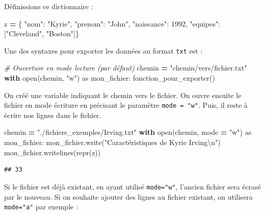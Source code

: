 \documentclass[
  12pt,
]{book}
\newenvironment{Shaded}{\begin{snugshade}}{\end{snugshade}}
\newcommand{\BuiltInTok}[1]{#1}
\newcommand{\CharTok}[1]{\textcolor[rgb]{0.31,0.60,0.02}{#1}}
\newcommand{\CommentTok}[1]{\textcolor[rgb]{0.56,0.35,0.01}{\textit{#1}}}
\newcommand{\ControlFlowTok}[1]{\textcolor[rgb]{0.13,0.29,0.53}{\textbf{#1}}}
\newcommand{\DecValTok}[1]{\textcolor[rgb]{0.00,0.00,0.81}{#1}}
\newcommand{\ImportTok}[1]{#1}
\newcommand{\NormalTok}[1]{#1}
\newcommand{\OperatorTok}[1]{\textcolor[rgb]{0.81,0.36,0.00}{\textbf{#1}}}
\newcommand{\StringTok}[1]{\textcolor[rgb]{0.31,0.60,0.02}{#1}}
\numberwithin{equation}{section}
\numberwithin{countremarque}{section}
\begin{document}
Définissions ce dictionnaire :

\begin{Shaded}
\begin{Highlighting}[]
\NormalTok{z }\OperatorTok{=}\NormalTok{ \{ }\StringTok{"nom"}\NormalTok{: }\StringTok{"Kyrie"}\NormalTok{,}
  \StringTok{"prenom"}\NormalTok{: }\StringTok{"John"}\NormalTok{,}
  \StringTok{"naissance"}\NormalTok{: }\DecValTok{1992}\NormalTok{,}
  \StringTok{"equipes"}\NormalTok{: [}\StringTok{"Cleveland"}\NormalTok{, }\StringTok{"Boston"}\NormalTok{]\}}
\end{Highlighting}
\end{Shaded}

Une des syntaxes pour exporter les données au format \texttt{txt} est :

\begin{Shaded}
\begin{Highlighting}[]
\CommentTok{\# Ouverture en mode lecture (par défaut)}
\NormalTok{chemin }\OperatorTok{=} \StringTok{"chemin/vers/fichier.txt"}
\ControlFlowTok{with} \BuiltInTok{open}\NormalTok{(chemin, }\StringTok{"w"}\NormalTok{) }\ImportTok{as}\NormalTok{ mon\_fichier:}
\NormalTok{  fonction\_pour\_exporter()}
\end{Highlighting}
\end{Shaded}

On créé une variable indiquant le chemin vers le fichier. On ouvre ensuite le fichier en mode écriture en précisant le paramètre \texttt{mode\ =\ "w"}. Puis, il reste à écrire nos lignes dans le fichier.

\begin{Shaded}
\begin{Highlighting}[]
\NormalTok{chemin }\OperatorTok{=} \StringTok{"./fichiers\_exemples/Irving.txt"}
\ControlFlowTok{with} \BuiltInTok{open}\NormalTok{(chemin, mode }\OperatorTok{=} \StringTok{"w"}\NormalTok{) }\ImportTok{as}\NormalTok{ mon\_fichier:}
\NormalTok{  mon\_fichier.write(}\StringTok{"Caractéristiques de Kyrie Irving}\CharTok{\textbackslash{}n}\StringTok{"}\NormalTok{)}
\NormalTok{  mon\_fichier.writelines(}\BuiltInTok{repr}\NormalTok{(z))}
\end{Highlighting}
\end{Shaded}

\begin{lstlisting}
## 33
\end{lstlisting}

Si le fichier est déjà existant, en ayant utilisé \texttt{mode="w"}, l'ancien fichier sera écrasé par le nouveau. Si on souhaite ajouter des lignes au fichier existant, on utilisera \texttt{mode="a"} par exemple :
\end{document}
